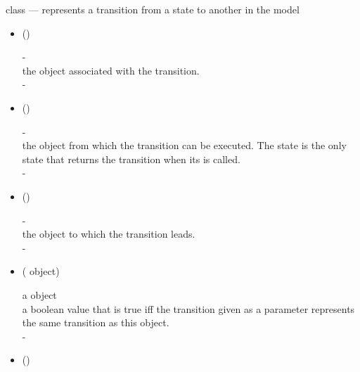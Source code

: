 \documentclass{article}
\begin{document}
\noindent{} class --- represents a transition
from a state to another in the model
\begin{itemize}
\item[] ()
  \begin{quot}
     -\\
     the  object associated with
    the transition.
    \\
     -
  \end{quot}
\item[] ()
  \begin{quot}
     -\\
     the  object from which the
    transition can be executed. The state is the only state that
    returns the transition when its  is
    called.
    \\
     -
  \end{quot}
\item[] ()
  \begin{quot}
     -\\
     the  object to which the
    transition leads.
    \\
     -
  \end{quot}
\item[] ( object)
  \begin{quot}
     a  object\\
     a boolean value that is true iff the transition
    given as a parameter represents the same transition as this
    object.
    \\
     -
  \end{quot}
\item[] ()
\end{itemize}
\end{document}
